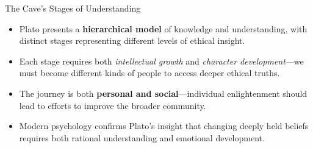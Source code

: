 \documentclass[aspectratio=169]{beamer}
\begin{document}
\begin{frame}{The Cave's Stages of Understanding}
\begin{itemize}
\item Plato presents a \textbf{hierarchical model} of knowledge and understanding, with distinct stages representing different levels of ethical insight.
\item Each stage requires both \emph{intellectual growth} and \emph{character development}—we must become different kinds of people to access deeper ethical truths.
\item The journey is both \textbf{personal and social}—individual enlightenment should lead to efforts to improve the broader community.
\item Modern psychology confirms Plato's insight that changing deeply held beliefs requires both rational understanding and emotional development.
\end{itemize}
\end{frame}
\end{document}
